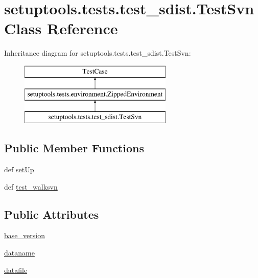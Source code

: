 \hypertarget{classsetuptools_1_1tests_1_1test__sdist_1_1TestSvn}{}\section{setuptools.\+tests.\+test\+\_\+sdist.\+Test\+Svn Class Reference}
\label{classsetuptools_1_1tests_1_1test__sdist_1_1TestSvn}
Inheritance diagram for setuptools.\+tests.\+test\+\_\+sdist.\+Test\+Svn\+:\begin{figure}[H]
\begin{center}
\leavevmode
\includegraphics[height=3.000000cm]{classsetuptools_1_1tests_1_1test__sdist_1_1TestSvn}
\end{center}
\end{figure}
\subsection*{Public Member Functions}
\begin{DoxyCompactItemize}
\item 
def \hyperlink{classsetuptools_1_1tests_1_1test__sdist_1_1TestSvn_a127e0263e8f2ccd6e5309fb7066844f7}{set\+Up}
\item 
def \hyperlink{classsetuptools_1_1tests_1_1test__sdist_1_1TestSvn_ad2b53491e840507129615b296ed08f42}{test\+\_\+walksvn}
\end{DoxyCompactItemize}
\subsection*{Public Attributes}
\begin{DoxyCompactItemize}
\item 
\hyperlink{classsetuptools_1_1tests_1_1test__sdist_1_1TestSvn_ad566b4838af512339f679d13dfe56157}{base\+\_\+version}
\item 
\hyperlink{classsetuptools_1_1tests_1_1test__sdist_1_1TestSvn_a2e3ee02698733c2f176f28a25001f178}{dataname}
\item 
\hyperlink{classsetuptools_1_1tests_1_1test__sdist_1_1TestSvn_afd855a73b3bb649f6f60bd5daff52f7c}{datafile}
\end{DoxyCompactItemize}
